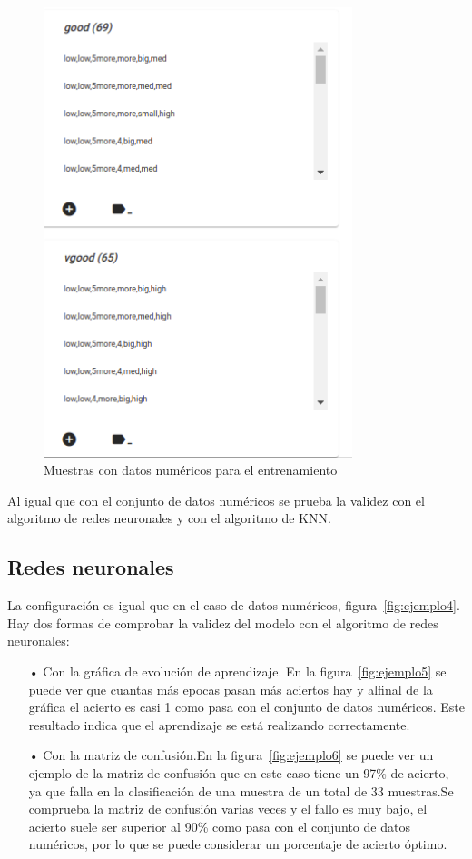 \documentclass[a4paper, 12pt]{book}
\begin{document}
\begin{figure}
	\centering
	\includegraphics[width=9cm, keepaspectratio]{img/ejemplo_muestras_numycat.png}
	\caption{Muestras con datos numéricos para el entrenamiento} 	\label{fig:ejemplo17}
\end{figure}

Al igual que con el conjunto de datos numéricos se prueba la validez con el algoritmo de redes neuronales y con el algoritmo de KNN.

\subsection{Redes neuronales}
\label{subsec:redesneuronales}

La configuración es igual que en el caso de datos numéricos, figura~\ref{fig:ejemplo4}.
Hay dos formas de comprobar la validez del modelo con el algoritmo de redes neuronales:

\begin{itemize}
\item[•] Con la gráfica de evolución de aprendizaje. En la figura~\ref{fig:ejemplo5} se puede ver que cuantas más epocas pasan más aciertos hay y alfinal de la gráfica el acierto es casi 1 como pasa con el conjunto de datos numéricos.
Este resultado indica que el aprendizaje se está realizando correctamente.
 \item[•] Con la matriz de confusión.En la figura~\ref{fig:ejemplo6} se puede ver un ejemplo de la matriz de confusión que en este caso tiene un 97\% de acierto, ya que falla en la clasificación de una muestra de un total de 33 muestras.Se comprueba la matriz de confusión varias veces y el fallo es muy bajo, el acierto suele ser superior al 90\% como pasa con el conjunto de datos numéricos, por lo que se puede considerar un porcentaje de acierto óptimo.
 \end{itemize}
 
\end{document}
